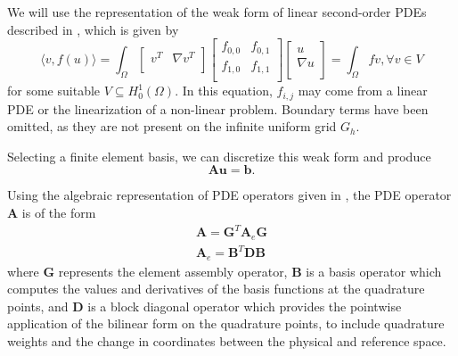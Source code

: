 \documentclass[review]{siamart190516}
\begin{document}
We will use the representation of the weak form of linear second-order PDEs described in \cite{brown2010efficient}, which is given by
\begin{equation}
\langle v, f \left( u \right) \rangle = \int_{\Omega}
\begin{bmatrix}
  v^T & \nabla v^T    \\
\end{bmatrix}
\begin{bmatrix}
  f_{0, 0} & f_{0, 1} \\
  f_{1, 0} & f_{1, 1} \\
\end{bmatrix}
\begin{bmatrix}
  u                   \\
  \nabla u            \\
\end{bmatrix}
= \int_{\Omega} f v, \forall v \in V
\end{equation}
for some suitable $V \subseteq H_0^1 \left( \Omega \right)$.
In this equation, $f_{i, j}$ may come from a linear PDE or the linearization of a non-linear problem.
Boundary terms have been omitted, as they are not present on the infinite uniform grid $G_h$.

Selecting a finite element basis, we can discretize this weak form and produce
\begin{equation}\label{pdediscrete}
\mathbf{A} \mathbf{u} = \mathbf{b}.
\end{equation}

Using the algebraic representation of PDE operators given in \cite{brown2010efficient}, the PDE operator $\mathbf{A}$ is of the form
\begin{equation}\label{efficienthighorder}
\begin{split}
\mathbf{A} = \mathbf{G}^T \mathbf{A}_e \mathbf{G}\\
\mathbf{A}_e = \mathbf{B}^T \mathbf{D} \mathbf{B}
\end{split}
\end{equation}
where $\mathbf{G}$ represents the element assembly operator, $\mathbf{B}$ is a basis operator which computes the values and derivatives of the basis functions at the quadrature points, and $\mathbf{D}$ is a block diagonal operator which provides the pointwise application of the bilinear form on the quadrature points, to include quadrature weights and the change in coordinates between the physical and reference space.
\end{document}
